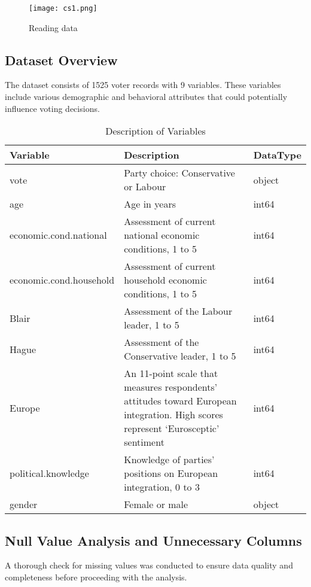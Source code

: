 \documentclass[12pt]{article}
\begin{document}
\begin{figure}[h]
    \centering
    \texttt{[image: cs1.png]}
    \caption{Reading data}
    \label{fig:example}
\end{figure}


\subsection{Dataset Overview}
The dataset consists of 1525 voter records with 9 variables. These variables include various demographic and behavioral attributes that could potentially influence voting decisions.

\begin{table}[H]
\centering
\caption{Description of Variables}
\label{tab:variable_description}
\begin{tabular}{l p{8cm} l}
\toprule
\textbf{Variable} & \textbf{Description} & \textbf{DataType}\\
\midrule
vote & Party choice: Conservative or Labour & object\\
age & Age in years & int64\\
economic.cond.national & Assessment of current national economic conditions, 1 to 5  & int64\\
economic.cond.household & Assessment of current household economic conditions, 1 to 5 & int64 \\
Blair & Assessment of the Labour leader, 1 to 5 & int64\\
Hague & Assessment of the Conservative leader, 1 to 5  & int64\\
Europe & An 11-point scale that measures respondents' attitudes toward European integration. High scores represent ‘Eurosceptic’ sentiment & int64\\
political.knowledge & Knowledge of parties' positions on European integration, 0 to 3  & int64\\
gender & Female or male  & object\\
\bottomrule
\end{tabular}
\end{table}

\subsection{Null Value Analysis and Unnecessary Columns}
A thorough check for missing values was conducted to ensure data quality and completeness before proceeding with the analysis.
\end{document}
